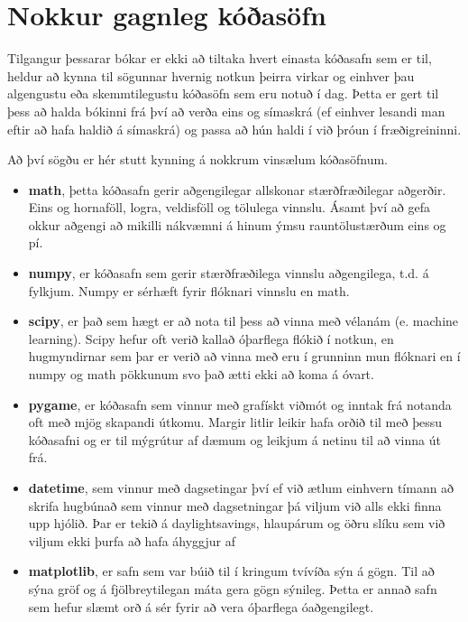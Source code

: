 \section{Nokkur gagnleg kóðasöfn}\label{uk:kóðasöfn-gagnleg}
Tilgangur þessarar bókar er ekki að tiltaka hvert einasta kóðasafn sem er til, heldur að kynna til sögunnar hvernig notkun þeirra virkar og einhver þau algengustu eða skemmtilegustu kóðasöfn sem eru notuð í dag.
Þetta er gert til þess að halda bókinni frá því að verða eins og símaskrá (ef einhver lesandi man eftir að hafa haldið á símaskrá) og passa að hún haldi í við þróun í fræðigreininni.

Að því sögðu er hér stutt kynning á nokkrum vinsælum kóðasöfnum.

\begin{itemize}
	\item \textbf{math}, þetta kóðasafn gerir aðgengilegar allskonar stærðfræðilegar aðgerðir.
	Eins og hornaföll, logra, veldisföll og tölulega vinnslu.
	Ásamt því að gefa okkur aðgengi að mikilli nákvæmni á hinum ýmsu rauntölustærðum eins og pí.
	\item \textbf{numpy}, er kóðasafn sem gerir stærðfræðilega vinnslu aðgengilega, t.d. á fylkjum.
	Numpy er sérhæft fyrir flóknari vinnslu en math.
	\item \textbf{scipy}, er það sem hægt er að nota til þess að vinna með vélanám (e. machine learning).
	Scipy hefur oft verið kallað óþarflega flókið í notkun, en hugmyndirnar sem þar er verið að vinna með eru í grunninn mun flóknari en í numpy og math pökkunum svo það ætti ekki að koma á óvart.
	\item \textbf{pygame}, er kóðasafn sem vinnur með grafískt viðmót og inntak frá notanda oft með mjög skapandi útkomu.
	Margir litlir leikir hafa orðið til með þessu kóðasafni og er til mýgrútur af dæmum og leikjum á netinu til að vinna út frá.
	\item \textbf{datetime}, sem vinnur með dagsetingar því ef við ætlum einhvern tímann að skrifa hugbúnað sem vinnur með dagsetningar þá viljum við alls ekki finna upp hjólið.
	Þar er tekið á daylightsavings, hlaupárum og öðru slíku sem við viljum ekki þurfa að hafa áhyggjur af
	\item \textbf{matplotlib}, er safn sem var búið til í kringum tvívíða sýn á gögn.
	Til að sýna gröf og á fjölbreytilegan máta gera gögn sýnileg.
	Þetta er annað safn sem hefur slæmt orð á sér fyrir að vera óþarflega óaðgengilegt.
\end{itemize}

